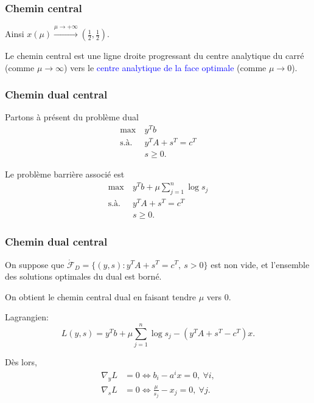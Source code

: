 \documentclass[usepdftitle=false, aspectratio=169]{beamer}
\begin{document}
\begin{frame}
\frametitle{Chemin central}

Ainsi $
x(\mu) \overset{\mu \rightarrow +\infty}{\longrightarrow} \left( \frac{1}{2}, \frac{1}{2} \right).
$

\mbox{}

Le chemin central est une ligne droite progressant du centre analytique du carré (comme $\mu \rightarrow \infty$) vers le \textcolor{blue}{centre analytique de la face optimale} (comme $\mu \rightarrow 0$).

\end{frame}

\begin{frame}
\frametitle{Chemin dual central}

Partons à présent du problème dual
\begin{align*}
\max\ & y^Tb \\
\mbox{s.à. } & y^TA + s^T = c^T \\
& s \geq 0.
\end{align*}

\mbox{}

Le problème barrière associé est
\begin{align*}
\max\ & y^Tb + \mu \sum^n_{j = 1} \log s_j \\
\mbox{s.à. } & y^TA + s^T = c^T \\
& s \geq 0.
\end{align*}

\end{frame}

\begin{frame}
\frametitle{Chemin dual central}

On suppose que $\mathring{\mathcal{F}}_D = \lbrace (y,s): y^TA + s^T = c^T,\ s > 0 \rbrace$ est non vide, et l'ensemble des solutions optimales du dual est borné.

\mbox{}

On obtient le chemin central dual en faisant tendre $\mu$ vers 0.

\mbox{}

Lagrangien:
\[
L(y,s) = y^Tb + \mu \sum_{j=1}^n \log s_j - (y^TA + s^T - c^T)x.
\]

\mbox{}

Dès lors,
\begin{align*}
\nabla_y L &= 0 \Leftrightarrow b_i - a^i x = 0,\ \forall i ,\\ 
\nabla_s L &= 0 \Leftrightarrow \frac{\mu}{s_j} - x_j = 0,\ \forall j.
\end{align*}

\end{frame}
\end{document}
